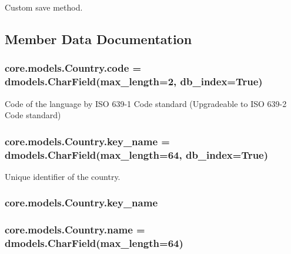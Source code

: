 Custom save method. 



\subsection{Member Data Documentation}
\hypertarget{classcore_1_1models_1_1Country_a0e69789f36a5e3ae61532a9cf69763a5}{
\subsubsection[{code}]{\setlength{\rightskip}{0pt plus 5cm}core.\-models.\-Country.\-code = dmodels.\-Char\-Field(max\-\_\-length=2, db\-\_\-index=True)\hspace{0.3cm}{\ttfamily [static]}}}\label{classcore_1_1models_1_1Country_a0e69789f36a5e3ae61532a9cf69763a5}


Code of the language by I\-S\-O 639-\/1 Code standard (Upgradeable to I\-S\-O 639-\/2 Code standard) 

\hypertarget{classcore_1_1models_1_1Country_ac21ce3fc1459b072b4fc49d53c525867}{
\subsubsection[{key\-\_\-name}]{\setlength{\rightskip}{0pt plus 5cm}core.\-models.\-Country.\-key\-\_\-name = dmodels.\-Char\-Field(max\-\_\-length=64, db\-\_\-index=True)\hspace{0.3cm}{\ttfamily [static]}}}\label{classcore_1_1models_1_1Country_ac21ce3fc1459b072b4fc49d53c525867}


Unique identifier of the country. 

\hypertarget{classcore_1_1models_1_1Country_ac21ce3fc1459b072b4fc49d53c525867}{
\subsubsection[{key\-\_\-name}]{\setlength{\rightskip}{0pt plus 5cm}core.\-models.\-Country.\-key\-\_\-name}}\label{classcore_1_1models_1_1Country_ac21ce3fc1459b072b4fc49d53c525867}
\hypertarget{classcore_1_1models_1_1Country_abadb165c9cb65ad347d076a20c1d7690}{
\subsubsection[{name}]{\setlength{\rightskip}{0pt plus 5cm}core.\-models.\-Country.\-name = dmodels.\-Char\-Field(max\-\_\-length=64)\hspace{0.3cm}{\ttfamily [static]}}}\label{classcore_1_1models_1_1Country_abadb165c9cb65ad347d076a20c1d7690}


